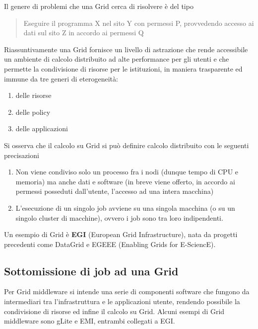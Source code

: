 \documentclass[italian,]{article}
\providecommand{\tightlist}{%
  \setlength{\itemsep}{0pt}\setlength{\parskip}{0pt}}
\begin{document}
Il genere di problemi che una Grid cerca di risolvere è del tipo

\begin{quote}
Eseguire il programma X nel sito Y con permessi P, provvedendo accesso
ai dati sul sito Z in accordo ai permessi Q
\end{quote}

Riassuntivamente una Grid fornisce un livello di astrazione che rende
accessibile un ambiente di calcolo distribuito ad alte performance per
gli utenti e che permette la condivisione di risorse per le istituzioni,
in maniera trasparente ed immune da tre generi di eterogeneità:

\begin{enumerate}
\def\labelenumi{\arabic{enumi}.}
\tightlist
\item
  delle risorse
\item
  delle policy
\item
  delle applicazioni
\end{enumerate}

Si osserva che il calcolo su Grid si può definire calcolo distribuito
con le seguenti precisazioni

\begin{enumerate}
\def\labelenumi{\arabic{enumi}.}
\tightlist
\item
  Non viene condiviso solo un processo fra i nodi (dunque tempo di CPU e
  memoria) ma anche dati e software (in breve viene offerto, in accordo
  ai permessi posseduti dall'utente, l'accesso ad una intera macchina)
\item
  L'esecuzione di un singolo job avviene su una singola macchina (o su
  un singolo cluster di macchine), ovvero i job sono tra loro
  indipendenti.
\end{enumerate}

Un esempio di Grid è \textbf{EGI} (European Grid Infrastructure), nata
da progetti precedenti come DataGrid e EGEEE (Enabling Grids for
E-SciencE).

\subsection{Sottomissione di job ad una
Grid}\label{sottomissione-di-job-ad-una-grid}

Per Grid middleware si intende una serie di componenti software che
fungono da intermediari tra l'infrastruttura e le applicazioni utente,
rendendo possibile la condivisione di risorse ed infine il calcolo su
Grid. Alcuni esempi di Grid middleware sono gLite e EMI, entrambi
collegati a EGI.
\end{document}
